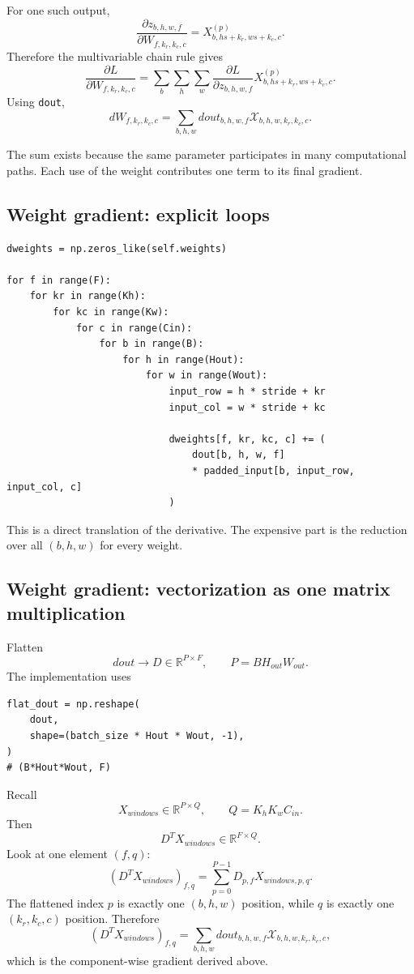 \documentclass[11pt,a4paper]{article}
\newcommand{\pd}[2]{\frac{\partial #1}{\partial #2}}
\newcommand{\R}{\mathbb{R}}
\newcommand{\code}[1]{\texttt{#1}}
\begin{document}
For one such output,
\[
\pd{z_{b,h,w,f}}{W_{f,k_r,k_c,c}}
=
X^{(p)}_{b,hs+k_r,ws+k_c,c}.
\]
Therefore the multivariable chain rule gives
\[
\boxed{
\pd{L}{W_{f,k_r,k_c,c}}
=
\sum_b\sum_h\sum_w
\pd{L}{z_{b,h,w,f}}
X^{(p)}_{b,hs+k_r,ws+k_c,c}
}.
\]
Using \code{dout},
\[
\boxed{
dW_{f,k_r,k_c,c}
=
\sum_{b,h,w}
dout_{b,h,w,f}
\mathcal{X}_{b,h,w,k_r,k_c,c}
}.
\]

The sum exists because the same parameter participates in many computational paths. Each use of the weight contributes one term to its final gradient.

\subsection{Weight gradient: explicit loops}

\begin{lstlisting}
dweights = np.zeros_like(self.weights)

for f in range(F):
    for kr in range(Kh):
        for kc in range(Kw):
            for c in range(Cin):
                for b in range(B):
                    for h in range(Hout):
                        for w in range(Wout):
                            input_row = h * stride + kr
                            input_col = w * stride + kc

                            dweights[f, kr, kc, c] += (
                                dout[b, h, w, f]
                                * padded_input[b, input_row, input_col, c]
                            )
\end{lstlisting}

This is a direct translation of the derivative. The expensive part is the reduction over all $(b,h,w)$ for every weight.

\subsection{Weight gradient: vectorization as one matrix multiplication}

Flatten
\[
dout\rightarrow D\in\R^{P\times F},
\qquad
P=BH_{out}W_{out}.
\]
The implementation uses
\begin{lstlisting}
flat_dout = np.reshape(
    dout,
    shape=(batch_size * Hout * Wout, -1),
)
# (B*Hout*Wout, F)
\end{lstlisting}

Recall
\[
X_{windows}\in\R^{P\times Q},
\qquad
Q=K_hK_wC_{in}.
\]
Then
\[
D^TX_{windows}\in\R^{F\times Q}.
\]
Look at one element $(f,q)$:
\[
(D^TX_{windows})_{f,q}
=
\sum_{p=0}^{P-1}D_{p,f}X_{windows,p,q}.
\]
The flattened index $p$ is exactly one $(b,h,w)$ position, while $q$ is exactly one $(k_r,k_c,c)$ position. Therefore
\[
(D^TX_{windows})_{f,q}
=
\sum_{b,h,w}
dout_{b,h,w,f}
\mathcal{X}_{b,h,w,k_r,k_c,c},
\]
which is the component-wise gradient derived above.
\end{document}
